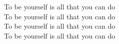 To be yourself is all that you can do \\
To be yourself is all that you can do \\
To be yourself is all that you can do \\
To be yourself is all that you can do
